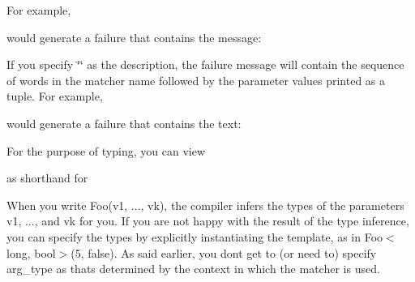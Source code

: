 For example, 
\begin{DoxyCode}{0}
\DoxyCodeLine{           std::string(negation ? "isn't" : "is") + " in range [" +}
\DoxyCodeLine{           PrintToString(low) + ", " + PrintToString(hi) + "]") \{}
\DoxyCodeLine{\}}
\end{DoxyCode}
 would generate a failure that contains the message\+: 
\begin{DoxyCode}{0}
\end{DoxyCode}


If you specify {\ttfamily \char`\"{}\char`\"{}} as the description, the failure message will contain the sequence of words in the matcher name followed by the parameter values printed as a tuple. For example, 
\begin{DoxyCode}{0}
\end{DoxyCode}
 would generate a failure that contains the text\+: 
\begin{DoxyCode}{0}
\end{DoxyCode}


For the purpose of typing, you can view 
\begin{DoxyCode}{0}
\end{DoxyCode}
 as shorthand for 
\begin{DoxyCode}{0}
\end{DoxyCode}


When you write {\ttfamily Foo(v1, ..., vk)}, the compiler infers the types of the parameters {\ttfamily v1}, ..., and {\ttfamily vk} for you. If you are not happy with the result of the type inference, you can specify the types by explicitly instantiating the template, as in {\ttfamily Foo$<$long, bool$>$(5, false)}. As said earlier, you don\textquotesingle{}t get to (or need to) specify {\ttfamily arg\+\_\+type} as that\textquotesingle{}s determined by the context in which the matcher is used.


